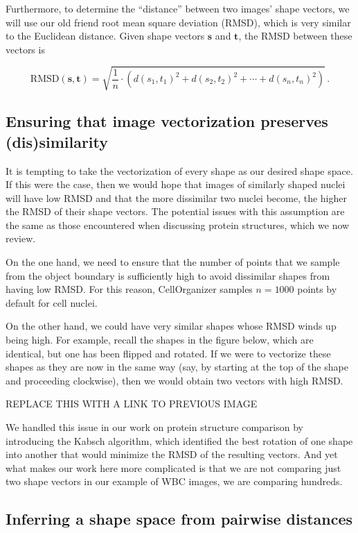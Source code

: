 Furthermore, to determine the ``distance'' between two images' shape vectors, we will use our old friend root mean square deviation (RMSD), which is very similar to the Euclidean distance. Given shape vectors $\mathbf{s}$ and $\mathbf{t}$, the RMSD between these vectors is

$$\text{RMSD}(\mathbf{s}, \mathbf{t}) = \sqrt{\dfrac{1}{n} \cdot (d(s_1, t_1)^2 + d(s_2, t_2)^2 + \cdots + d(s_n, t_n)^2)}\,. $$

\FloatBarrier
{}
\subsection{Ensuring that image vectorization preserves (dis)similarity}

It is tempting to take the vectorization of every shape as our desired shape space. If this were the case, then we would hope that images of similarly shaped nuclei will have low RMSD and that the more dissimilar two nuclei become, the higher the RMSD of their shape vectors. The potential issues with this assumption are the same as those encountered when discussing protein structures, which we now review.

On the one hand, we need to ensure that the number of points that we sample from the object boundary is sufficiently high to avoid dissimilar shapes from having low RMSD. For this reason, CellOrganizer samples $n = 1000$ points by default for cell nuclei.

On the other hand, we could have very similar shapes whose RMSD winds up being high. For example, recall the shapes in the figure below, which are identical, but one has been flipped and rotated. If we were to vectorize these shapes as they are now in the same way (say, by starting at the top of the shape and proceeding clockwise), then we would obtain two vectors with high RMSD.

REPLACE THIS WITH A LINK TO PREVIOUS IMAGE

We handled this issue in our work on protein structure comparison by introducing the Kabsch algorithm, which identified the best rotation of one shape into another that would minimize the RMSD of the resulting vectors. And yet what makes our work here more complicated is that we are not comparing just two shape vectors in our example of WBC images, we are comparing hundreds.

\FloatBarrier
{}
\subsection{Inferring a shape space from pairwise distances}

